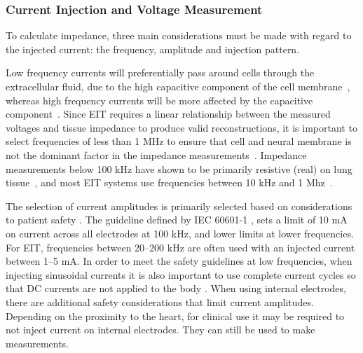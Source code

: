 \subsubsection{Current Injection and Voltage Measurement}
To calculate impedance, three main considerations must be made with regard to the 
injected current: the frequency, amplitude and injection pattern. 

Low frequency currents will 
preferentially pass around cells through the extracellular
fluid, due to the high capacitive component of the cell 
membrane~\parencite{foster_whole-body_1996}, whereas high frequency currents will be 
more affected by the capacitive 
component~\parencite{holder_electrical_2004}. 
Since EIT requires a linear relationship between the measured voltages and 
tissue impedance to produce valid reconstructions,
it is important to select frequencies of less than 1 MHz to ensure that cell 
and neural membrane is not the dominant factor in the impedance 
measurements~\parencite{barber_applied_1984}.
Impedance measurements below 100 kHz have shown to be primarily resistive (real) on lung
tissue~\parencite{witsoe_electrical_1967}, and most EIT systems use
frequencies between 10 kHz and 1 Mhz~\parencite{holder_electrical_2004}.

The selection of current amplitudes is primarily selected based on 
considerations to patient safety \parencite{adler_electrical_2017}.
The guideline defined by IEC 60601-1 
\parencite{international_electrotechnical_commission_iec_2021}, sets a limit 
of 10 mA on current across all electrodes at 100 kHz, and lower limits 
at lower frequencies. 
For EIT, frequencies between 20--200 kHz are often used with 
an injected current
between 1--5 mA.
In order to meet the safety
guidelines at low frequencies,
when injecting sinusoidal currents it is also important to use complete current cycles 
so that DC currents are not applied to the body \parencite{adler_electrical_2017}.
When using internal electrodes, there are additional safety considerations that limit
current amplitudes. Depending on the proximity to the heart, for clinical use 
it may be required to not inject current on internal electrodes. They can still be used
to make measurements. 

